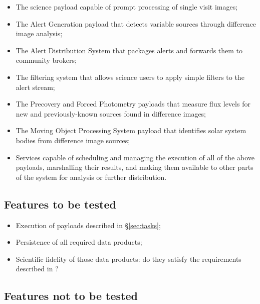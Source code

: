 \documentclass[DM,STS,toc]{lsstdoc}
\begin{document}
\begin{itemize}

  \item{The science payload capable of prompt processing of single visit
	  images;}

  \item{The Alert Generation payload that detects variable sources through
	  difference image analysis;}

  \item{The Alert Distribution System that packages alerts and forwards
	  them to community brokers;}

  \item{The filtering system that allows science users to apply simple
	  filters to the alert stream;}


  \item{The Precovery and Forced Photometry payloads that measure flux
	  levels for new and previously-known sources found in difference
	  images;}

  \item{The Moving Object Processing System payload that identifies solar
	  system bodies from difference image sources;}

  \item{Services capable of scheduling and managing the execution of all of
  the above payloads, marshalling their results, and making them available to
  other parts of the system for analysis or further distribution.}

\end{itemize}

\subsection{Features to be tested}
\label{sec:feat2test}

\begin{itemize}

  \item{Execution of payloads described in \S\ref{sec:tasks};}
  \item{Persistence of all required data products;}
  \item{Scientific fidelity of those data products: do they satisfy the
  requirements described in ?}

\end{itemize}

\subsection{Features not to be tested}
\label{sec:featnot2test}
\end{document}
